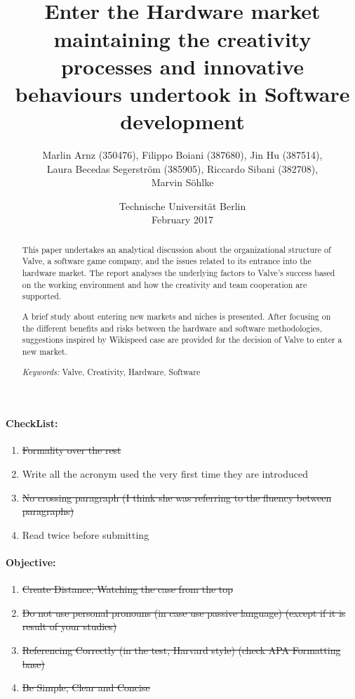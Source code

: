 \documentclass[12pt,twoside,notitle,a4paper]{article}
\title{\TITLES  \\
	\large Enter the Hardware market maintaining the creativity processes and innovative behaviours undertook in Software development}
\author{
	\small
	Marlin Arnz (350476), Filippo Boiani (387680), Jin Hu (387514), \\
	\small
	Laura Becedas Segerström (385905), Riccardo Sibani (382708), \\
	\small
	Marvin Söhlke
	}
\date{ Technische Universität Berlin \\ February 2017}
\newenvironment{notation}{%
   \def\FrameCommand{\colorbox{yellow!20}}%
   \MakeFramed{\advance\hsize-\width \FrameRestore}}
 {\endMakeFramed}
\begin{document}
\maketitle


\thispagestyle{fancy}

\begin{notation}
\begin{small}
\paragraph{CheckList:}
\begin{enumerate}
\item \st{Formality over the rest}
\item Write all the acronym used the very first time they are introduced
\item \st{No crossing paragraph (I think she was referring to the fluency between paragraphs)}
\item Read twice before submitting
\end{enumerate}

\paragraph{Objective:}
\begin{enumerate}
\item \st{Create Distance, Watching the case from the top}
\item \st{Do not use personal pronouns (in case use passive language) (except if it is result of your studies)}
\item \st{Referencing Correctly (in the test, Harvard style) (check APA Formatting base)}
\item \st{Be Simple, Clear and Concise}
\end{enumerate}
\end{small}
\end{notation}

\begin{abstract}
This paper undertakes an analytical discussion about the organizational structure of Valve, a software game company, and the issues related to its entrance into the hardware market. The report analyses the underlying factors to Valve's success based on the working environment and how the creativity and team cooperation are supported. 

A brief study about entering new markets and niches is presented. 
After focusing on the different benefits and risks between the hardware and software methodologies, suggestions inspired by Wikispeed case are provided for the decision of Valve to enter a new market.

\begin{center}
\textit{Keywords:} Valve, Creativity, Hardware, Software
\end{center}

\end{abstract}
\end{document}
